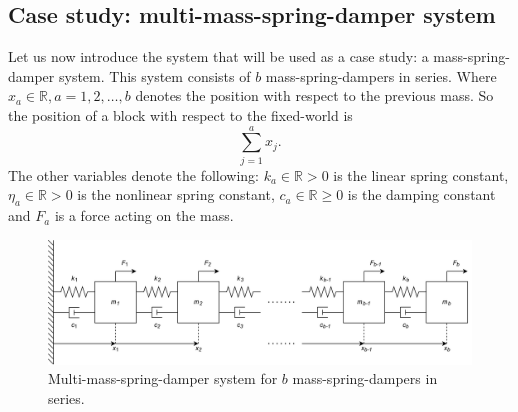 \subsection{Case study: multi-mass-spring-damper system}
Let us now introduce the system that will be used as a case study: a mass-spring-damper system. This system consists of $b$ mass-spring-dampers in series. Where $x_a \in \mathbb{R},a=1,2,\dots,b$ denotes the position with respect to the previous mass. So the position of a block with respect to the fixed-world is
\begin{equation}\label{eqn:mass-position-wrt-fixed-world}
    \sum^{a}_{j=1}x_j.
\end{equation}
The other variables denote the following: $k_a\in \mathbb{R}>0$ is the linear spring constant, $\eta_a\in \mathbb{R}>0$ is the nonlinear spring constant, $c_a\in \mathbb{R}\geq0$ is the damping constant and $F_a$ is a force acting on the mass.
\begin{figure}[ht]
    \centering
    \includegraphics[width=0.9\linewidth]{report/Figures/Mass-spring-damper system.png}
    \caption{Multi-mass-spring-damper system for $b$ mass-spring-dampers in series.}
    \label{fig:mass-spring-damper-system-series}
\end{figure}

